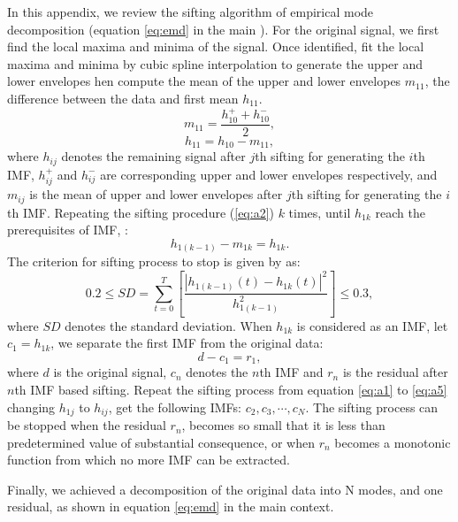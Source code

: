In this appendix, we review the sifting algorithm of empirical mode decomposition (equation \ref{eq:emd} in the main ). 
For the original signal, we first find the local maxima and minima of the signal. Once identified, fit the local maxima and minima by cubic spline interpolation   to generate the upper and lower envelopes\dlo{,} hen compute the mean of the upper and lower envelopes $m_{11}$, the difference between the data and first mean $h_{11}$.
\begin{equation}
\label{eq:a1}
m_{11}=\frac{h^{+}_{10}+h^{-}_{10}}{2},
\end{equation}
\begin{equation}
\label{eq:a2}
h_{11}=h_{10}-m_{11},
\end{equation}
where $h_{ij}$ denotes the remaining signal after $j$th sifting for generating the $i$th IMF, $h^+_{ij}$ and $h^-_{ij}$ are corresponding upper and lower envelopes\wen{,} respectively, and $m_{ij}$ is the mean of upper and lower envelopes after $j$th sifting for generating the $i$th IMF.
Repeating the sifting procedure (\ref{eq:a2}) $k$ times, until $h_{1k}$ reach the prerequisites of IMF, :
\begin{equation}
\label{eq:a3}
h_{1(k-1)}-m_{1k}=h_{1k}.
\end{equation}
The criterion for  sifting process to stop is given by \cite{emd} as:
\begin{equation}
\label{eq:a4}
0.2\le SD=\sum_{t=0}^{T}\left[\frac{|h_{1(k-1)}(t)-h_{1k}(t)|^2}{h^2_{1(k-1)}}\right]\le 0.3,
\end{equation}
where $SD$ denotes the standard deviation.
When $h_{1k}$ is considered as an IMF, let $c_1=h_{1k}$, we separate the first IMF from the original data:
\begin{equation}
\label{eq:a5}
d-c_1=r_1,
\end{equation}
where $d$ is the original signal, $c_n$ denotes the $n$th IMF\wen{,} and $r_n$ is the residual after  $n$th IMF based sifting.
Repeat the sifting process from equation \ref{eq:a1} to \ref{eq:a5}\wen{,} changing $h_{1j}$ to $h_{ij}$,  get the following IMFs: $c_2, c_3, \cdots, c_N$.
The sifting process can be stopped when the residual $r_n$, becomes so small that it is less than  predetermined value of substantial consequence, or when $r_n$  becomes a monotonic function from which no more IMF can be extracted.

Finally, we achieved a decomposition of the original data into N modes, and one residual, as shown in equation \ref{eq:emd} in the main context.




